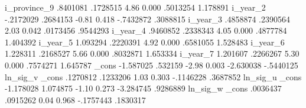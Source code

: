     i_province_9 {\VBAR}   .8401081   .1728515     4.86   0.000     .5013254    1.178891
        i_year_2 {\VBAR}  -.2172029   .2684153    -0.81   0.418    -.7432872    .3088815
        i_year_3 {\VBAR}   .4858874   .2390564     2.03   0.042     .0173456    .9544293
        i_year_4 {\VBAR}   .9460852   .2338343     4.05   0.000     .4877784    1.404392
        i_year_5 {\VBAR}   1.093294   .2220391     4.92   0.000     .6581055    1.528483
        i_year_6 {\VBAR}   1.228311   .2168527     5.66   0.000     .8032871    1.653334
        i_year_7 {\VBAR}   1.201607   .2266267     5.30   0.000     .7574271    1.645787
           _cons {\VBAR}  -1.587025    .532159    -2.98   0.003    -2.630038   -.5440125
ln_sig_v         {\VBAR}
           _cons {\VBAR}   .1270812   .1233206     1.03   0.303    -.1146228    .3687852
ln_sig_u         {\VBAR}
           _cons {\VBAR}  -1.178028   1.074875    -1.10   0.273    -3.284745    .9286889
ln_sig_w         {\VBAR}
           _cons {\VBAR}   .0036437   .0915262     0.04   0.968    -.1757443    .1830317
